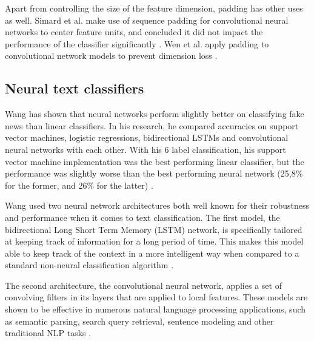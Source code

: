Apart from controlling the size of the feature dimension, padding has other uses as well. 
Simard et al. make use of sequence padding for convolutional neural networks to center feature units, and concluded it did not impact the performance of the classifier significantly \cite{simard2003}. 
Wen et al. apply padding to convolutional network models to prevent dimension loss \cite{wen2018}. 

\subsection{Neural text classifiers}
Wang has shown that neural networks perform slightly better on classifying fake news than linear classifiers. 
In his research, he compared accuracies on support vector machines, logistic regressions, bidirectional LSTMs and convolutional neural networks with each other.
With his 6 label classification, his support vector machine implementation was the best performing linear classifier, but the performance was slightly worse than the best performing neural network (25,8\% for the former, and 26\% for the latter) \cite{wang2018}.

Wang used two neural network architectures both well known for their robustness and performance when it comes to text classification. 
The first model, the bidirectional Long Short Term Memory (LSTM) network, is specifically tailored at keeping track of information for a long period of time. 
This makes this model able to keep track of the context in a more intelligent way when compared to a standard non-neural classification algorithm \cite{olah2015}. 

The second architecture, the convolutional neural network, applies a set of convolving filters in its layers that are applied to local features. 
These models are shown to be effective in numerous natural language processing applications, such as semantic parsing, search query retrieval, sentence modeling and other traditional NLP tasks \cite{kim2014}.  